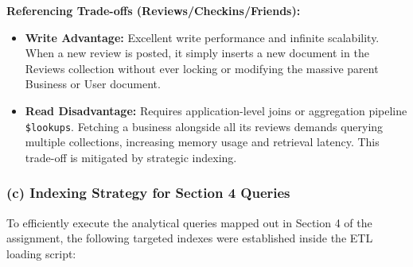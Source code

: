 \documentclass[11pt,a4paper]{article}
\begin{document}
\textbf{Referencing Trade-offs (Reviews/Checkins/Friends):}
\begin{itemize}
    \item \textbf{Write Advantage:} Excellent write performance and infinite scalability. When a new review is posted, it simply inserts a new document in the Reviews collection without ever locking or modifying the massive parent Business or User document.
    \item \textbf{Read Disadvantage:} Requires application-level joins or aggregation pipeline \texttt{\$lookups}. Fetching a business alongside all its reviews demands querying multiple collections, increasing memory usage and retrieval latency. This trade-off is mitigated by strategic indexing.
\end{itemize}

\subsubsection*{(c) Indexing Strategy for Section 4 Queries}
To efficiently execute the analytical queries mapped out in Section 4 of the assignment, the following targeted indexes were established inside the ETL loading script:
\end{document}
